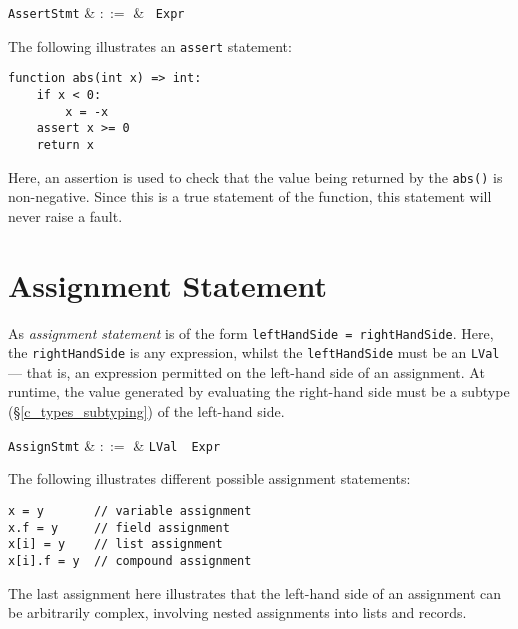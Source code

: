 \begin{syntax}
  \verb+AssertStmt+ & $::=$ & \ \verb+Expr+\\
\end{syntax}

\noindent The following illustrates an \lstinline{assert} statement:
\begin{lstlisting}
function abs(int x) => int:
    if x < 0:
        x = -x
    assert x >= 0
    return x
\end{lstlisting}

Here, an assertion is used to check that the value being returned by the \lstinline{abs()} is non-negative.  Since this is a true statement of the function, this statement will never raise a fault.


\section{Assignment Statement}

As {\em assignment statement} is of the form \lstinline{leftHandSide = rightHandSide}.  Here, the \lstinline{rightHandSide} is any expression, whilst the \lstinline{leftHandSide} must be an \lstinline{LVal} --- that is, an expression permitted on the left-hand side of an assignment.  At runtime, the value generated by evaluating the right-hand side must be a subtype (\S\ref{c_types_subtyping}) of the left-hand side.

\begin{syntax}
  \verb+AssignStmt+ & $::=$ & \verb+LVal+\ \token{=}\ \verb+Expr+\\
\end{syntax}


\noindent The following illustrates different possible assignment statements:
\begin{lstlisting}
x = y       // variable assignment
x.f = y     // field assignment
x[i] = y    // list assignment
x[i].f = y  // compound assignment
\end{lstlisting}

The last assignment here illustrates that the left-hand side of an assignment can be arbitrarily complex, involving nested assignments into lists and records.


